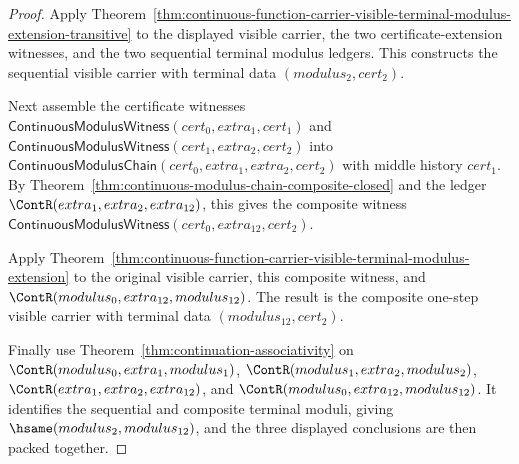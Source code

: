 \begin{proof}
Apply
Theorem~\ref{thm:continuous-function-carrier-visible-terminal-modulus-extension-transitive}
to the displayed visible carrier, the two certificate-extension witnesses, and
the two sequential terminal modulus ledgers. This constructs the sequential
visible carrier with terminal data $(modulus_2,cert_2)$.

Next assemble the certificate witnesses
$\mathsf{ContinuousModulusWitness}(cert_0,extra_1,cert_1)$ and
$\mathsf{ContinuousModulusWitness}(cert_1,extra_2,cert_2)$ into
$\mathsf{ContinuousModulusChain}(cert_0,extra_1,extra_2,cert_2)$ with middle
history $cert_1$. By
Theorem~\ref{thm:continuous-modulus-chain-composite-closed} and the ledger
$\ContR(extra_1,extra_2,extra_{12})$, this gives the composite witness
$\mathsf{ContinuousModulusWitness}(cert_0,extra_{12},cert_2)$.

Apply
Theorem~\ref{thm:continuous-function-carrier-visible-terminal-modulus-extension}
to the original visible carrier, this composite witness, and
$\ContR(modulus_0,extra_{12},modulus_{12})$. The result is the composite
one-step visible carrier with terminal data $(modulus_{12},cert_2)$.

Finally use Theorem~\ref{thm:continuation-associativity} on
$\ContR(modulus_0,extra_1,modulus_1)$,
$\ContR(modulus_1,extra_2,modulus_2)$,
$\ContR(extra_1,extra_2,extra_{12})$, and
$\ContR(modulus_0,extra_{12},modulus_{12})$. It identifies the sequential and
composite terminal moduli, giving $\hsame(modulus_2,modulus_{12})$, and the
three displayed conclusions are then packed together.
\end{proof}

